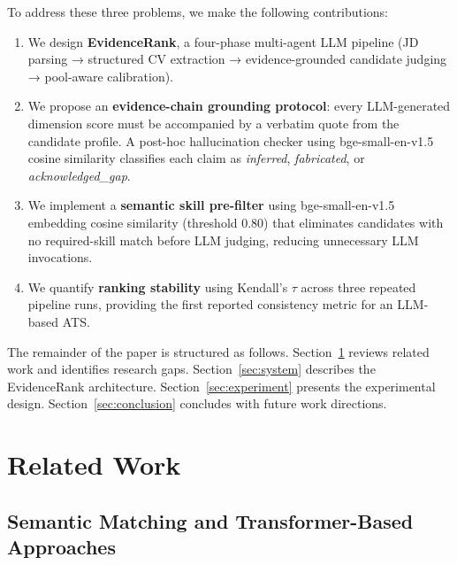\documentclass[journal]{IEEEtran}
\begin{document}
To address these three problems, we make the following contributions:

\begin{enumerate}
  \item We design \textbf{EvidenceRank}, a four-phase multi-agent LLM pipeline
        (JD parsing → structured CV extraction → evidence-grounded candidate
        judging → pool-aware calibration).

  \item We propose an \textbf{evidence-chain grounding protocol}: every
        LLM-generated dimension score must be accompanied by a verbatim quote
        from the candidate profile. A post-hoc hallucination checker using
        bge-small-en-v1.5 cosine similarity classifies each claim as
        \textit{inferred}, \textit{fabricated}, or
        \textit{acknowledged\_gap}.

  \item We implement a \textbf{semantic skill pre-filter} using bge-small-en-v1.5
        embedding cosine similarity (threshold 0.80) that eliminates candidates with
        no required-skill match before LLM judging, reducing unnecessary LLM invocations.

  \item We quantify \textbf{ranking stability} using Kendall's $\tau$ across
        three repeated pipeline runs, providing the first reported consistency
        metric for an LLM-based ATS.
\end{enumerate}

The remainder of the paper is structured as follows. Section~\ref{sec:related}
reviews related work and identifies research gaps. Section~\ref{sec:system}
describes the EvidenceRank architecture. Section~\ref{sec:experiment} presents
the experimental design. Section~\ref{sec:conclusion} concludes with future work directions.


\section{Related Work}
\label{sec:related}

\subsection{Semantic Matching and Transformer-Based Approaches}
\end{document}
